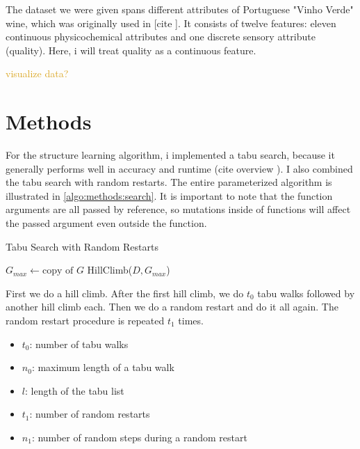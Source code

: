 \documentclass[sigconf, fleqn, prologue, dvipsnames]{acmart}
\newcommand{\maybe}[1]{%
	\textcolor{Goldenrod}{#1?}%
    \reversemarginpar%
    \marginpar{\raggedleft\textcolor{Goldenrod}{\rule{2mm}{2mm}}}%
}
\def\ndy{%
    \reversemarginpar%
    \marginpar{\raggedleft\textcolor{red}{\rule{2mm}{2mm}}}%
}
\begin{document}
The dataset we were given spans different attributes of Portuguese "Vinho Verde" wine, which was originally used in [cite\ndy].
It consists of twelve features: eleven continuous physicochemical attributes and one discrete sensory attribute (quality).
Here, i will treat quality as a continuous feature.

\maybe{visualize data}
\FloatBarrier


\section{Methods}
For the structure learning algorithm, i implemented a tabu search, because it generally performs well in accuracy and runtime (cite overview\ndy).
I also combined the tabu search with random restarts. The entire parameterized algorithm is illustrated in \autoref{algo:methods:search}.
It is important to note that the function arguments are all passed by reference, so mutations inside of functions will affect the passed argument even outside the function.

\begin{algorithm}
	\caption{Tabu Search with Random Restarts}
	\label{algo:methods:search}

	$G_{max} \gets \text{copy of } G$\;
	HillClimb($D, G_{max}$)\;
\end{algorithm}

First we do a hill climb. After the first hill climb, we do $t_0$ tabu walks followed by another hill climb each.
Then we do a random restart and do it all again. The random restart procedure is repeated $t_1$ times.
\begin{itemize}
	\item $t_0$: number of tabu walks
	\item $n_0$: maximum length of a tabu walk
	\item $l$: length of the tabu list
	\item $t_1$: number of random restarts
	\item $n_1$: number of random steps during a random restart
\end{itemize}
\end{document}
